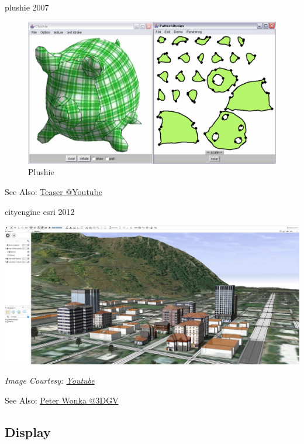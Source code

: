 \documentclass[aspectratio=169,xcolor={dvipsnames,svgnames}]{beamer}
\begin{document}
\begin{frame}[label={sec:org05e148a}]{plushie 2007}
\centering

\begin{figure}[htbp]
\centering
\includegraphics[width=0.6\linewidth]{images/plushie-2007.jpg}
\caption{Plushie \cite{MI07}}
\end{figure}

See Also: \href{https://www.youtube.com/watch?v=rbQWxL-\_8LU}{Teaser @Youtube}
\end{frame}

\begin{frame}[label={sec:orgde46839}]{cityengine esri 2012}
\centering

\begin{center}
\includegraphics[width=0.8\linewidth]{images/cityengine-esri.jpg}
\end{center}
\tiny \emph{Image Courtesy: \href{https://www.youtube.com/watch?v=aFRqSJFp-I0}{Youtube}}

See Also: \href{https://www.youtube.com/watch?v=jsFztFXiPTM}{Peter Wonka @3DGV}
\end{frame}

\subsection{Display}
\label{sec:orgce45c6e}
\end{document}
